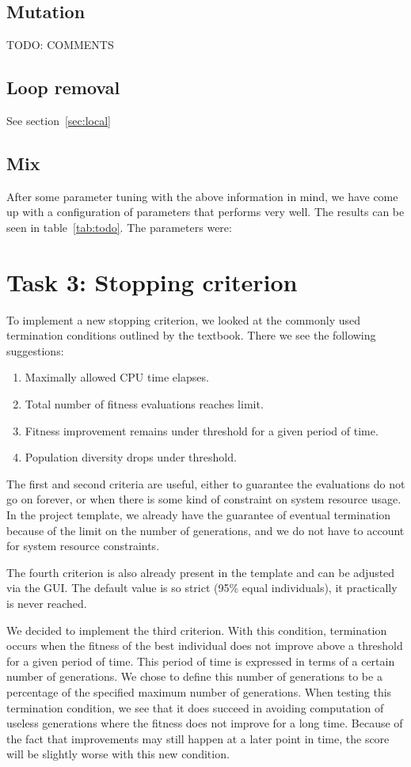 \documentclass{report}
\begin{document}
\subsection{Mutation}
TODO: COMMENTS

\subsection{Loop removal}
See section~\ref{sec:local}

\subsection{Mix}
After some parameter tuning with the above information in mind, we have come up with a configuration of parameters that performs very well. The results can be seen in table~\ref{tab:todo}. The parameters were:



\section{Task 3: Stopping criterion}
To implement a new stopping criterion, we looked at the commonly used termination conditions outlined by the textbook. There we see the following suggestions:
\begin{enumerate}
	\item Maximally allowed CPU time elapses.
	\item Total number of fitness evaluations reaches limit.
	\item Fitness improvement remains under threshold for a given period of time.
	\item Population diversity drops under threshold.
\end{enumerate}
The first and second criteria are useful, either to guarantee the evaluations do not go on forever, or when there is some kind of constraint on system resource usage. In the project template, we already have the guarantee of eventual termination because of the limit on the number of generations, and we do not have to account for system resource constraints.

The fourth criterion is also already present in the template and can be adjusted via the GUI. The default value is so strict (95\% equal individuals), it practically is never reached.

We decided to implement the third criterion. With this condition, termination occurs when the fitness of the best individual does not improve above a threshold for a given period of time. This period of time is expressed in terms of a certain number of generations. We chose to define this number of generations to be a percentage of the specified maximum number of generations. When testing this termination condition, we see that it does succeed in avoiding computation of useless generations where the fitness does not improve for a long time. Because of the fact that improvements may still happen at a later point in time, the score will be slightly worse with this new condition.
\end{document}
